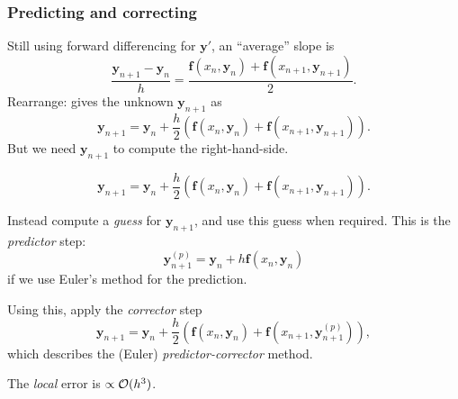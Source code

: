 \documentclass{beamer}
\newcommand{\by}{{\boldsymbol{y}}}
\newcommand{\bfm}[1]{{\boldsymbol{#1}}}
\begin{document}
\begin{frame}
  \frametitle{Predicting and correcting}

  \begin{overlayarea}{\textwidth}{0.8\textheight}
    {
      Still using forward differencing for $\by'$, an ``average''
      slope is
      \begin{equation*}
        \frac{\by_{n+1} - \by_n}{h} = \frac{\bfm{f}(x_n, \by_n) +
          \bfm{f}(x_{n+1}, \by_{n+1})}{2}.
      \end{equation*}
    }
    {
      Rearrange: gives the unknown $\by_{n+1}$ as
      \begin{equation*}
        \by_{n+1} = \by_n + \frac{h}{2} \left( \bfm{f}(x_n, \by_n) +
          \bfm{f}(x_{n+1}, \by_{n+1}) \right).
      \end{equation*}
    }
    {
      But we need $\by_{n+1}$ to compute the right-hand-side.
    }
    {
      \begin{equation*}
        \by_{n+1} = \by_n + \frac{h}{2} \left( \bfm{f}(x_n, \by_n) +
          \bfm{f}(x_{n+1}, \by_{n+1}) \right).
      \end{equation*}

      \vspace{1ex}

      Instead compute a \emph{guess} for $\by_{n+1}$, and use this
      guess when required. This is the \emph{predictor} step:
      \begin{equation*}
        \by_{n+1}^{(p)} = \by_n + h \bfm{f}(x_n, \by_n)
      \end{equation*}
      if we use Euler's method for the prediction.
    }
    {

      \vspace{1ex}
      Using this, apply the \emph{corrector} step
      \begin{equation*}
        \by_{n+1} = \by_n + \frac{h}{2} \left( \bfm{f}(x_n, \by_n) +
          \bfm{f}(x_{n+1}, \by_{n+1}^{(p)}) \right),
      \end{equation*}
      which describes the (Euler) \emph{predictor-corrector} method.
    }
    {

      \vspace{1ex}
      The \emph{local} error is $\propto {\cal O}(h^3)$.
    }
  \end{overlayarea}

\end{frame}
\end{document}

